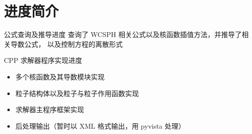 \section{进度简介}

\begin{frame}
    \begin{block}{公式查询及推导进度}
        查询了 WCSPH 相关公式以及核函数插值方法，并推导了相关导数公式，
        以及控制方程的离散形式
    \end{block}
    \begin{block}{CPP 求解器程序实现进度}
        \begin{itemize}
            \item 多个核函数及其导数模块实现
            \item 粒子结构体以及粒子与粒子作用函数实现
            \item 求解器主程序框架实现
            \item 后处理输出（暂时以 XML 格式输出，用 pyvista 处理）
        \end{itemize}
    \end{block}
\end{frame}